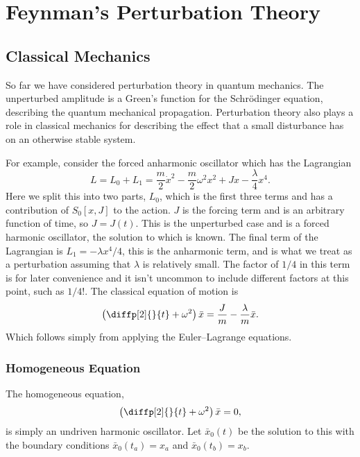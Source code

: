 \documentclass[fleqn]{NotesClass}
\newcommand*{\lagrangian}{L}
\begin{document}
    
    \chapter{Feynman's Perturbation Theory}
    \section{Classical Mechanics}
    So far we have considered perturbation theory in quantum mechanics.
    The unperturbed amplitude is a Green's function for the Schr\"odinger equation, describing the quantum mechanical propagation.
    Perturbation theory also plays a role in classical mechanics for describing the effect that a small disturbance has on an otherwise stable system.
    
    For example, consider the forced anharmonic oscillator which has the Lagrangian
    \begin{equation}
        \lagrangian = \lagrangian_0 + \lagrangian_1 = \frac{m}{2}\dot{x}^2 - \frac{m}{2}\omega^2x^2 + Jx - \frac{\lambda}{4}x^4.
    \end{equation}
    Here we split this into two parts, \(\lagrangian_0\), which is the first three terms and has a contribution of \(S_0[x, J]\) to the action.
    \(J\) is the forcing term and is an arbitrary function of time, so \(J = J(t)\).
    This is the unperturbed case and is a forced harmonic oscillator, the solution to which is known.
    The final term of the Lagrangian is \(\lagrangian_1 = -\lambda x^4/4\), this is the anharmonic term, and is what we treat as a perturbation assuming that \(\lambda\) is relatively small.
    The factor of \(1/4\) in this term is for later convenience and it isn't uncommon to include different factors at this point, such as \(1/4!\).
    The classical equation of motion is
    \begin{equation}
        \left( \diffp[2]{}{t} + \omega^2 \right)\bar{x} = \frac{J}{m} - \frac{\lambda}{m}\bar{x}.
    \end{equation}
    Which follows simply from applying the Euler--Lagrange equations.
    
    \subsection{Homogeneous Equation}
    The homogeneous equation,
    \begin{equation}
        \left( \diffp[2]{}{t} + \omega^2 \right)\bar{x} = 0,
    \end{equation}
    is simply an undriven harmonic oscillator.
    Let \(\bar{x}_0(t)\) be the solution to this with the boundary conditions \(\bar{x}_0(t_a) = x_a\) and \(\bar{x}_0(t_b) = x_b\).
    
\end{document}
